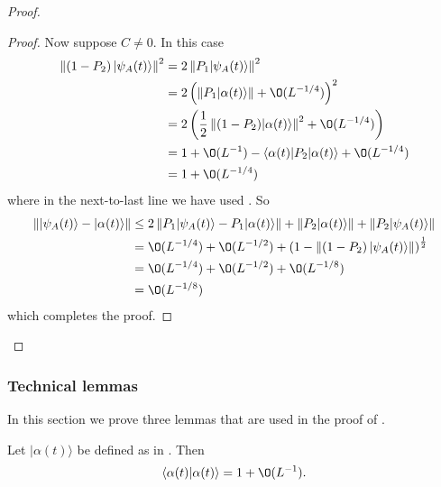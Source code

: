 \documentclass[../thesis-main/thesis-main]{subfiles}
\begin{document}
\begin{proof}
\begin{proof}
Now suppose $C\neq0$. In this case
\begin{align*}
\left\Vert \left(1-P_{2}\right)|\psi_{A}(t)\rangle\right\Vert ^{2} & = 2\left\Vert P_{1}|\psi_{A}(t)\rangle\right\Vert ^{2}\\
 & = 2\left(\left\Vert P_{1}|\alpha(t)\rangle\right\Vert +\O(L^{-{1}/{4}})\right)^2\\
 & = 2\left(\frac{1}{2}\left\Vert (1-P_{2})|\alpha(t)\rangle\right\Vert ^{2}+\O(L^{-{1}/{4}})\right)\\
 & = 1+\O(L^{-1})-\langle\alpha(t)|P_{2}|\alpha(t)\rangle+\O(L^{-{1}/{4}})\\
 & = 1+\O(L^{-{1}/{4}})
\end{align*}
where in the next-to-last line we have used . So
\begin{align*}
\left\Vert |\psi_{A}(t)\rangle-|\alpha(t)\rangle\right\Vert  & \leq 2\left\Vert P_{1}|\psi_{A}(t)\rangle-P_{1}|\alpha(t)\rangle\right\Vert +\left\Vert P_{2}|\alpha(t)\rangle\right\Vert +\left\Vert P_{2}|\psi_{A}(t)\rangle\right\Vert \\
 & = \O(L^{-{1}/{4}})+\O(L^{-{1}/{2}})+\left(1-\left\Vert \left(1-P_{2}\right)|\psi_{A}(t)\rangle\right\Vert \right)^{\frac{1}{2}}\\
 & = \O(L^{-{1}/{4}})+\O(L^{-{1}/{2}})+\O(L^{-{1}/{8}})\\
 & = \O(L^{-{1}/{8}})
 \end{align*}
which completes the proof. 
\end{proof}
\end{proof}

\subsubsection{Technical lemmas}
\label{sec:techlem}

In this section we prove three lemmas that are used in the proof of .

\begin{lemma} \label{lem:alpha}
Let $|\alpha(t)\rangle$ be defined as in .
Then
\[
\langle\alpha(t)|\alpha(t)\rangle=1+\O(L^{-1}).
\]
\end{lemma}
\end{document}

